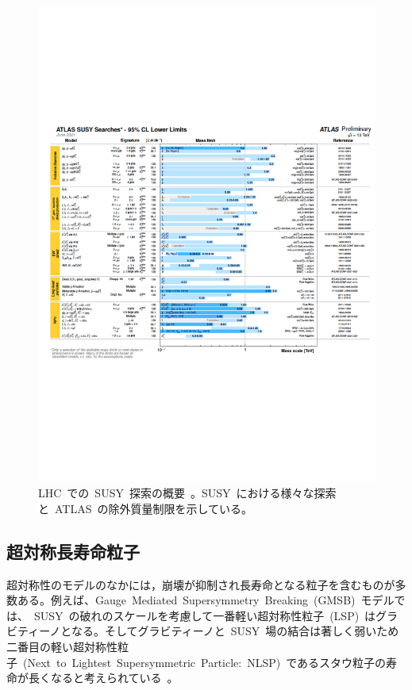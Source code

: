 \begin{figure}[tbp]
        \centering   
        \includegraphics[width=\textwidth,page=1]{img/pdf/susy1.pdf}
        \caption[LHC~での~SUSY~探索の概要]{LHC~での~SUSY~探索の概要~\cite{AR:13e}。SUSY~における様々な探索と~ATLAS~の除外質量制限を示している。}\label{fig:susy1}
\end{figure}


\subsection{超対称長寿命粒子}
\label{subsec:LSP}
超対称性のモデルのなかには，崩壊が抑制され長寿命となる粒子を含むものが多数ある。例えば、Gauge~Mediated~Supersymmetry~Breaking~(GMSB)~モデルでは、~SUSY~の破れのスケールを考慮して一番軽い超対称性粒子~(LSP)~はグラビティーノとなる。そしてグラビティーノと~SUSY~場の結合は著しく弱いため二番目の軽い超対称性粒子~(Next~to~Lightest~Supersymmetric~Particle:~NLSP)~であるスタウ粒子の寿命が長くなると考えられている~\cite{AR:12d,AR:12e}。

